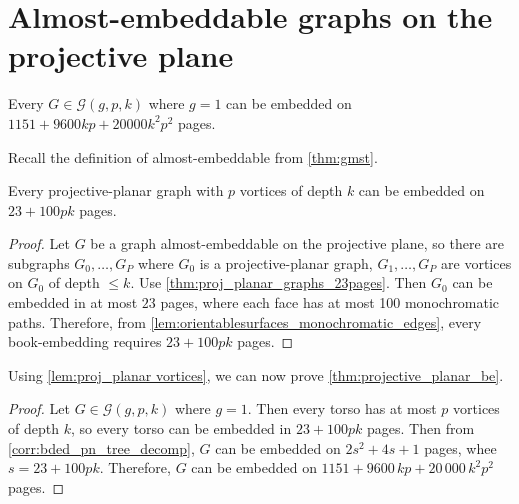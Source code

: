 
\section{Almost-embeddable graphs on the projective plane}

\begin{theorem}\label{thm:projective_planar_be}
	Every $G \in \mathcal{G}(g, p, k)$ where $g = 1$ can be embedded on $1151 + 9600 k p + 20000 k^2 p^2$ pages.
\end{theorem}
Recall the definition of almost-embeddable from \cref{thm:gmst}. 
\begin{lemma}\label{lem:proj_planar vortices}
	Every projective-planar graph with $p$ vortices of depth $k$ can be embedded on $23 + 100pk$ pages.
\end{lemma}
\begin{proof}
	Let $G$ be a graph almost-embeddable on the projective plane, so there are subgraphs $G_0, \ldots, G_P$ where $G_0$ is a projective-planar graph, $G_1, \ldots, G_P$ are vortices on $G_0$ of depth $\leq k$. Use \cref{thm:proj_planar_graphs_23pages}. Then $G_0$ can be embedded in at most $23$ pages, where each face has at most 100 monochromatic paths. Therefore, from \cref{lem:orientablesurfaces_monochromatic_edges}, every book-embedding requires $23 + 100pk$ pages.
\end{proof}

Using \cref{lem:proj_planar vortices}, we can now prove \cref{thm:projective_planar_be}.
\begin{proof}
	Let $G \in \mathcal{G}(g, p, k)$ where $g = 1$. Then every torso has at most $p$ vortices of depth $k$, so every torso can be embedded in $23 + 100 pk$ pages. Then from \cref{corr:bded_pn_tree_decomp}, $G$ can be embedded on $2s^2 + 4s + 1$ pages, whee $s = 23 + 100pk$. Therefore, $G$ can be embedded on $1151 + 9600\,k p + 20\,000\,k^2 p^2$ pages.
\end{proof}
